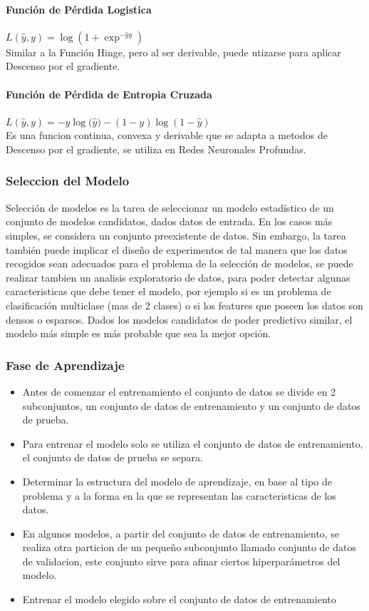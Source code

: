 \documentclass[a4paper,11pt,spanish]{book}
\begin{document}
	  \paragraph{Función de Pérdida Logistica} $L({\widehat y}, y) =  {\log(1+ {\exp^{-{\widehat y}y}})}$\\
	    Similar a la Función Hinge, pero al ser derivable, puede utizarse para aplicar Descenso por el gradiente.
	  \paragraph{Función de Pérdida de Entropia Cruzada} $L({\widehat y}, y) = -y{\log({\widehat y}}) - (1-y) {\log(1-{\widehat y})}$\\
	    Es una funcion continua, convexa y derivable que se adapta a metodos de Descenso por el gradiente, se utiliza en Redes Neuronales Profundas.

	\subsubsection {Seleccion del Modelo}
	  Selección de modelos es la tarea de seleccionar un modelo estadístico de un conjunto de modelos candidatos, dados datos de entrada. 
	  En los casos más simples, se considera un conjunto preexistente de datos. 
	  Sin embargo, la tarea también puede implicar el diseño de experimentos de tal manera que los datos recogidos sean adecuados para el problema de la selección de modelos,
	  se puede realizar tambien un analisis exploratorio de datos, para poder detectar algunas caracteristicas que debe tener el modelo, por ejemplo si es un problema de clasificación
	  multiclase (mas de 2 clases) o si los features que poseen los datos son densos o esparsos.
	  Dados los modelos candidatos de poder predictivo similar, el modelo más simple es más probable que sea la mejor opción.

	\subsubsection {Fase de Aprendizaje}
	  \begin{itemize}
	    \item Antes de comenzar el entrenamiento el conjunto de datos se divide en 2 subconjuntos, un conjunto de datos de entrenamiento y un conjunto de datos de prueba. 
	    \item Para entrenar el modelo solo se utiliza el conjunto de datos de entrenamiento, el conjunto de datos de prueba se separa.
	    \item Determinar la estructura del modelo de aprendizaje, en base al tipo de problema y a la forma en la que se representan las caracteristicas de los datos.
	    \item En algunos modelos, a partir del conjunto de datos de entrenamiento, se realiza otra particion de un pequeño subconjunto llamado conjunto de datos de validacion, este conjunto sirve 
	    para afinar ciertos hiperparámetros del modelo.
	    \item Entrenar el modelo elegido sobre el conjunto de datos de entrenamiento
	  \end{itemize}
	
\end{document}
